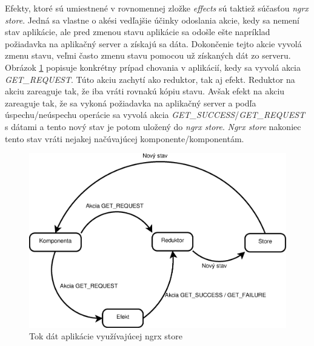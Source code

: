 Efekty, ktoré sú umiestnené v rovnomennej zložke \textit{effects} sú taktiež súčasťou \textit{ngrx store}. Jedná sa vlastne o akési vedľajšie účinky odoslania akcie, kedy sa nemení stav aplikácie, ale pred zmenou stavu aplikácie sa odošle ešte napríklad požiadavka na aplikačný server a získajú sa dáta. Dokončenie tejto akcie vyvolá zmenu stavu, veľmi často zmenu stavu pomocou už získaných dát zo serveru.\cite{pzU1UYWXatJMcZgL} Obrázok \ref{fig:ngrx} popisuje konkrétny prípad chovania v aplikácií, kedy sa vyvolá akcia \textit{GET\_REQUEST}. Túto akciu zachytí ako reduktor, tak aj efekt. Reduktor na akciu zareaguje tak, že iba vráti rovnakú kópiu stavu. Avšak efekt na akciu zareaguje tak, že sa vykoná požiadavka na aplikačný server a podľa úspechu/neúspechu operácie sa vyvolá akcia \textit{GET\_SUCCESS}/\textit{GET\_REQUEST} s dátami a tento nový stav je potom uložený do \textit{ngrx store}. \textit{Ngrx store} nakoniec tento stav vráti nejakej načúvajúcej komponente/komponentám. 
\begin{figure}[h]
  \centering
  \includegraphics[scale=0.4]{fig/ngrx-efekt.eps}
  \caption{Tok dát aplikácie využívajúcej ngrx store}
  \label{fig:ngrx}
\end{figure}

